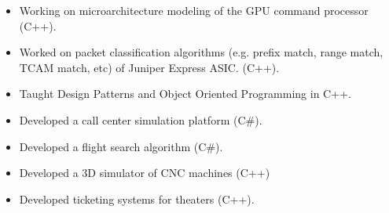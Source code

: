 \begin{itemize}
	\item Working on microarchitecture modeling of the GPU command processor (C++).
\end{itemize}

\divider

\begin{itemize}
	\item Worked on packet classification algorithms (e.g. prefix match, range match, TCAM match, etc) of Juniper Express ASIC. (C++).
\end{itemize}

\divider

\begin{itemize}
	\item Taught Design Patterns and Object Oriented Programming in C++.
\end{itemize}

\divider

\begin{itemize}
	\item Developed a call center simulation platform (C\#).
\end{itemize}

\divider

\begin{itemize}
	\item Developed a flight search algorithm (C\#).
\end{itemize}

\divider

\begin{itemize}
\item Developed a 3D simulator of CNC machines (C++)
\end{itemize}

\divider

\begin{itemize}
	\item Developed ticketing systems for theaters (C++).
\end{itemize}

